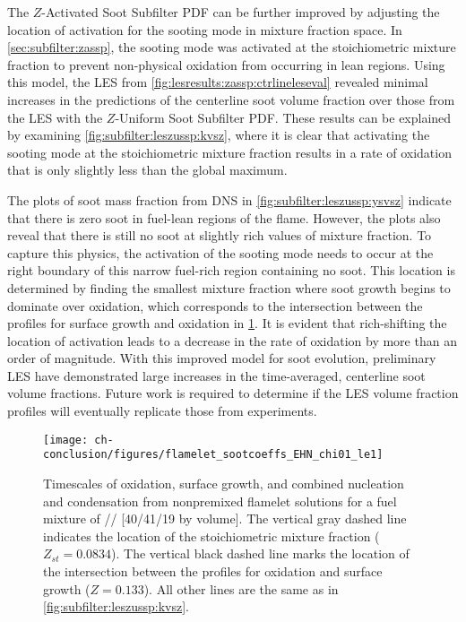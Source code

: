 The $Z$-Activated Soot Subfilter PDF can be further improved by adjusting the location of activation for the sooting mode in mixture fraction space. In \cref{sec:subfilter:zassp}, the sooting mode was activated at the stoichiometric mixture fraction to prevent non-physical oxidation from occurring in lean regions. Using this model, the LES from \cref{fig:lesresults:zassp:ctrlineleseval} revealed minimal increases in the predictions of the centerline soot volume fraction over those from the LES with the $Z$-Uniform Soot Subfilter PDF. These results can be explained by examining \cref{fig:subfilter:leszussp:kvsz}, where it is clear that activating the sooting mode at the stoichiometric mixture fraction results in a rate of oxidation that is only slightly less than the global maximum.

The plots of soot mass fraction from DNS in \cref{fig:subfilter:leszussp:ysvsz} indicate that there is zero soot in fuel-lean regions of the flame. However, the plots also reveal that there is still no soot at slightly rich values of mixture fraction. To capture this physics, the activation of the sooting mode needs to occur at the right boundary of this narrow fuel-rich region containing no soot. This location is determined by finding the smallest mixture fraction where soot growth begins to dominate over oxidation, which corresponds to the intersection between the profiles for surface growth and oxidation in \cref{fig:conclusion:future:zassp:shiftedz}. It is evident that rich-shifting the location of activation leads to a decrease in the rate of oxidation by more than an order of magnitude. With this improved model for soot evolution, preliminary LES have demonstrated large increases in the time-averaged, centerline soot volume fractions. Future work is required to determine if the LES volume fraction profiles will eventually replicate those from experiments.
\begin{figure}[htb]
  \centering
  \texttt{[image: ch-conclusion/figures/flamelet\_sootcoeffs\_EHN\_chi01\_le1]}
  \caption[Shifted Activation of ZASSP]{Timescales of oxidation, surface growth, and combined nucleation and condensation from nonpremixed flamelet solutions for a fuel mixture of // [40/41/19 by volume]. The vertical gray dashed line indicates the location of the stoichiometric mixture fraction ($Z_{st} = 0.0834$). The vertical black dashed line marks the location of the intersection between the profiles for oxidation and surface growth ($Z = 0.133$). All other lines are the same as in \cref{fig:subfilter:leszussp:kvsz}.}
  \label{fig:conclusion:future:zassp:shiftedz}
\end{figure}



